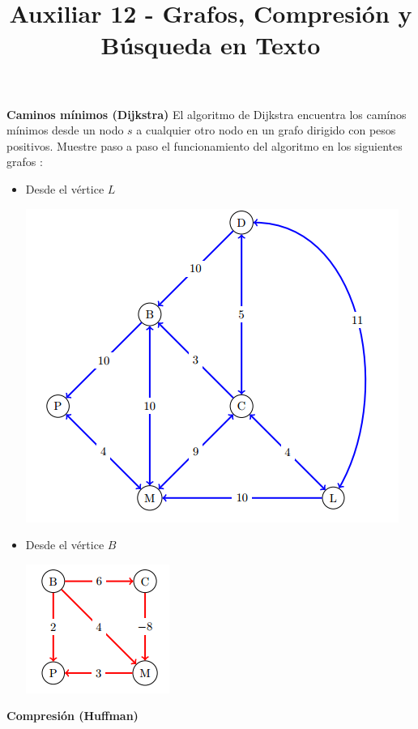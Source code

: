 \documentclass[dcc,uchile]{fcfmcourse}
\title{Auxiliar 12 - Grafos, Compresión y Búsqueda en Texto}
\begin{document}
\maketitle

\vspace{-1ex}


\begin{problems}
\problem \textbf{Caminos mínimos (Dijkstra)}
El algoritmo de Dijkstra encuentra los camínos mínimos desde un nodo $s$ a cualquier otro nodo en un grafo dirigido con pesos positivos. Muestre paso a paso el funcionamiento del algoritmo en los siguientes grafos :
\begin{itemize}
    \item Desde el vértice $L$ \\
    \begin{center}
        \includegraphics[scale=0.5]{imagenes/grafo.png}
    \end{center}
    \item Desde el vértice $B$ \\
    \begin{center}
        \includegraphics[scale=0.5]{imagenes/grafo2.png}
    \end{center}
\end{itemize}
\newpage
\problem \textbf{Compresión (Huffman)}


\end{problems}
\end{document}

